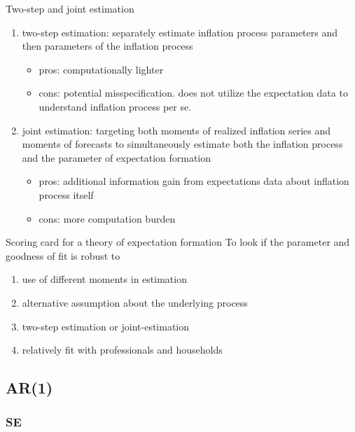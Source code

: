 \documentclass{beamer}
\begin{document}
\begin{frame}{Two-step and joint estimation}
	\begin{enumerate}
		\item two-step estimation:  separately estimate inflation process parameters and then parameters of the inflation process
		\begin{itemize}
			\item pros: computationally lighter 
			\item cons: potential misspecification. does not utilize the expectation data to understand inflation process per se.  
		\end{itemize}
		\item joint estimation: targeting both moments of realized inflation series and moments of forecasts to simultaneously estimate both the inflation process and the parameter of expectation formation
		\begin{itemize}
			\item pros: additional information gain from expectations data about inflation process itself
			\item cons: more computation burden  
		\end{itemize}
	\end{enumerate}
\end{frame}



\begin{frame}{Scoring card for a theory of expectation formation}
	To look if the parameter and goodness of fit is robust to 
	\begin{enumerate}
		\item use of different moments in estimation
		\item alternative assumption about the underlying process 
		\item two-step estimation or joint-estimation 
		\item relatively fit with professionals and households  
	\end{enumerate}
\end{frame}

\subsection{AR(1)}

\subsubsection{SE}
\end{document}
